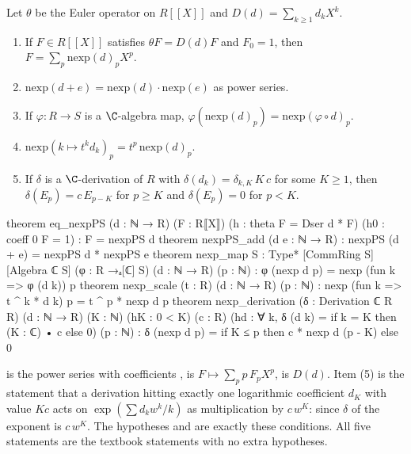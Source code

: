 \begin{lemma}\label{ch08:lem:nexp}
Let $\theta$ be the Euler operator on $R[[X]]$ and $D(d)=\sum_{k\ge1}d_kX^k$.
\begin{enumerate}
\item If $F\in R[[X]]$ satisfies $\theta F=D(d)F$ and $F_0=1$, then $F=\sum_p\mathrm{nexp}(d)_pX^p$.
\item $\mathrm{nexp}(d+e)=\mathrm{nexp}(d)\cdot\mathrm{nexp}(e)$ as power series.
\item If $\varphi:R\to S$ is a $\C$-algebra map, $\varphi(\mathrm{nexp}(d)_p)=\mathrm{nexp}(\varphi\circ d)_p$.
\item $\mathrm{nexp}(k\mapsto t^kd_k)_p=t^p\,\mathrm{nexp}(d)_p$.
\item If $\delta$ is a $\C$-derivation of $R$ with $\delta(d_k)=\delta_{k,K}\,K\,c$ for some
  $K\ge1$, then $\delta(E_p)=c\,E_{p-K}$ for $p\ge K$ and $\delta(E_p)=0$ for $p<K$.
\end{enumerate}
\end{lemma}
\begin{leancode}
theorem eq_nexpPS (d : ℕ → R) (F : R⟦X⟧) (h : theta F = Dser d * F) (h0 : coeff 0 F = 1) :
    F = nexpPS d
theorem nexpPS_add (d e : ℕ → R) : nexpPS (d + e) = nexpPS d * nexpPS e
theorem nexp_map {S : Type*} [CommRing S] [Algebra ℂ S] (φ : R →ₐ[ℂ] S) (d : ℕ → R) (p : ℕ) :
    φ (nexp d p) = nexp (fun k => φ (d k)) p
theorem nexp_scale (t : R) (d : ℕ → R) (p : ℕ) :
    nexp (fun k => t ^ k * d k) p = t ^ p * nexp d p
theorem nexp_derivation (δ : Derivation ℂ R R) (d : ℕ → R) (K : ℕ) (hK : 0 < K) (c : R)
    (hd : ∀ k, δ (d k) = if k = K then (K : ℂ) • c else 0) (p : ℕ) :
    δ (nexp d p) = if K ≤ p then c * nexp d (p - K) else 0
\end{leancode}
\begin{dictionary}
 is the power series with coefficients ,  is
$F\mapsto\sum_pp\,F_pX^p$,  is $D(d)$.  Item (5) is the statement that a derivation
hitting exactly one logarithmic coefficient $d_K$ with value $Kc$ acts on $\exp(\sum d_kw^k/k)$
as multiplication by $c\,w^K$: since $\delta$ of the exponent is $c\,w^K$.  The hypotheses
 and  are exactly these conditions.  All five statements are the
textbook statements with no extra hypotheses.
\end{dictionary}

